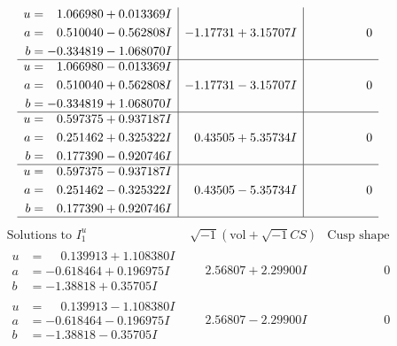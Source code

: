 \documentclass[1p]{elsarticle_modified}
\theoremstyle{definition}
\newcommand{\I}{\sqrt{-1}}
\begin{document}
$$\begin{array}{c|c|c}
\begin{aligned}
u &= \phantom{-}1.066980 + 0.013369 I \\
a &= \phantom{-}0.510040 - 0.562808 I \\
b &= -0.334819 - 1.068070 I\end{aligned}
 & -1.17731 + 3.15707 I & \phantom{-0.000000 } 0 \\ \hline\begin{aligned}
u &= \phantom{-}1.066980 - 0.013369 I \\
a &= \phantom{-}0.510040 + 0.562808 I \\
b &= -0.334819 + 1.068070 I\end{aligned}
 & -1.17731 - 3.15707 I & \phantom{-0.000000 } 0 \\ \hline\begin{aligned}
u &= \phantom{-}0.597375 + 0.937187 I \\
a &= \phantom{-}0.251462 + 0.325322 I \\
b &= \phantom{-}0.177390 - 0.920746 I\end{aligned}
 & \phantom{-}0.43505 + 5.35734 I & \phantom{-0.000000 } 0 \\ \hline\begin{aligned}
u &= \phantom{-}0.597375 - 0.937187 I \\
a &= \phantom{-}0.251462 - 0.325322 I \\
b &= \phantom{-}0.177390 + 0.920746 I\end{aligned}
 & \phantom{-}0.43505 - 5.35734 I & \phantom{-0.000000 } 0\\
 \hline 
 \end{array}$$\newpage$$\begin{array}{c|c|c}  
\text{Solutions to }I^u_{1}& \I (\text{vol} + \sqrt{-1}CS) & \text{Cusp shape}\\
 \hline 
\begin{aligned}
u &= \phantom{-}0.139913 + 1.108380 I \\
a &= -0.618464 + 0.196975 I \\
b &= -1.38818 + 0.35705 I\end{aligned}
 & \phantom{-}2.56807 + 2.29900 I & \phantom{-0.000000 } 0 \\ \hline\begin{aligned}
u &= \phantom{-}0.139913 - 1.108380 I \\
a &= -0.618464 - 0.196975 I \\
b &= -1.38818 - 0.35705 I\end{aligned}
 & \phantom{-}2.56807 - 2.29900 I & \phantom{-0.000000 } 0 \\ \hline\begin{aligned}

\end{aligned}
\end{array}$$
\end{document}
